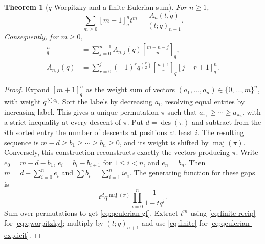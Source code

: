 \documentclass[11pt,a4paper]{article}
\numberwithin{equation}{section}
\newtheorem{theorem}{Theorem}[section]
\theoremstyle{definition}
\theoremstyle{remark}
\newcommand{\G}[2]{\genfrac{[}{]}{0pt}{}{#1}{#2}_{q}}
\newcommand{\des}{\operatorname{des}}
\newcommand{\maj}{\operatorname{maj}}
\begin{document}
\begin{theorem}[$q$-Worpitzky and a finite Eulerian sum]
\label{thm:worpitzky}
For $n\ge1$,
\begin{equation}
 \sum_{m\ge0}[m+1]_q^n t^m=\frac{A_n(t,q)}{(t;q)_{n+1}}.
 \label{eq:qeulerian-gf}
\end{equation}
Consequently, for $m\ge0$,
\begin{align}
 [m+1]_q^n&=\sum_{j=0}^{n-1}A_{n,j}(q)\G{m+n-j}n,
 \label{eq:qworpitzky}\\
 A_{n,j}(q)&=\sum_{r=0}^j(-1)^rq^{\binom r2}\G{n+1}r[j-r+1]_q^n.
 \label{eq:qeulerian-explicit}
\end{align}
\end{theorem}
\begin{proof}
Expand $[m+1]_q^n$ as the weight sum of vectors
$(a_1,\ldots,a_n)\in\{0,\ldots,m\}^n$, with weight $q^{\sum a_i}$.
Sort the labels by decreasing $a_i$, resolving equal entries by
increasing label. This gives a unique permutation $\pi$ such that
$a_{\pi_1}\ge\cdots\ge a_{\pi_n}$, with a strict inequality at every
descent of $\pi$. Put $d=\des(\pi)$ and subtract from the $i$th sorted
entry the number of descents at positions at least $i$. The resulting
sequence is
$ m-d\ge b_1\ge\cdots\ge b_n\ge0$, and its weight is shifted by
$\maj(\pi)$. Conversely, this construction reconstructs exactly the
vectors producing $\pi$.
Write $e_0=m-d-b_1$, $e_i=b_i-b_{i+1}$ for $1\le i<n$, and $e_n=b_n$.
Then $m=d+\sum_{i=0}^ne_i$ and $\sum b_i=\sum_{i=1}^ni e_i$.
The generating function for these gaps is
\[
 t^dq^{\maj(\pi)}\prod_{i=0}^n\frac1{1-tq^i}.
\]
Sum over permutations to get \cref{eq:qeulerian-gf}. Extract $t^m$
using \cref{eq:finite-recip} for \cref{eq:qworpitzky}; multiply by
$(t;q)_{n+1}$ and use \cref{eq:finite} for
\cref{eq:qeulerian-explicit}.
\end{proof}
\end{document}
